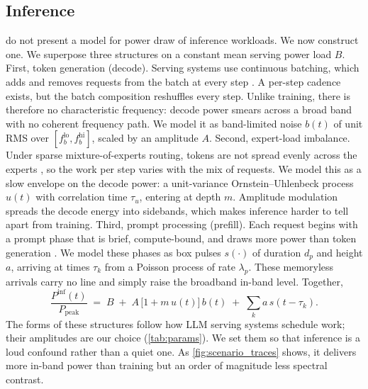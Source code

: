 \documentclass{article}
\begin{document}
\subsection{Inference}
\label{subsec:null}
\citet{ko2025widearea} do not present a model for power draw of inference workloads. We now construct one. We superpose three structures on a constant mean serving power load $B$. First, token generation (decode). Serving systems use continuous batching,
which adds and removes requests from the batch at every step
\citep{yu2022orca,kwon2023vllm}. A per-step cadence exists, but the batch
composition reshuffles every step. Unlike training, there is therefore no
characteristic frequency: decode power smears across a broad band with no
coherent frequency path. We model it as band-limited noise $b(t)$ of unit RMS
over $[f_b^{\mathrm{lo}}, f_b^{\mathrm{hi}}]$, scaled by an amplitude $A$. Second, expert-load imbalance. Under sparse mixture-of-experts routing, tokens
are not spread evenly across the experts \citep{shazeer2017moe}, so the work per
step varies with the mix of requests. We model this as a slow envelope on the
decode power: a unit-variance Ornstein--Uhlenbeck process $u(t)$ with
correlation time $\tau_u$, entering at depth $m$. Amplitude modulation spreads
the decode energy into sidebands, which makes inference harder to tell apart from training. Third, prompt processing (prefill). Each request begins with a prompt phase that
is brief, compute-bound, and draws more power than token generation
\citep{patel2024characterizing,patel2024splitwise}. We model these phases as box
pulses $s(\cdot)$ of duration $d_p$ and height $a$, arriving at times $\tau_k$
from a Poisson process of rate $\lambda_p$. These memoryless arrivals carry no
line and simply raise the broadband in-band level. Together,
\begin{equation}
	\frac{P^{\mathrm{inf}}(t)}{P_{\mathrm{peak}}} \;=\;
	B \;+\; A\,\bigl[1 + m\,u(t)\bigr]\,b(t) \;+\; \sum_k a\,s(t - \tau_k).
	\label{eq:null}
\end{equation}
The forms of these structures follow how LLM serving systems schedule work;
their amplitudes are our choice (\cref{tab:params}). We set them so that
inference is a loud confound rather than a quiet one. As
\cref{fig:scenario_traces} shows, it delivers more in-band power than training
but an order of magnitude less spectral contrast.
\end{document}
